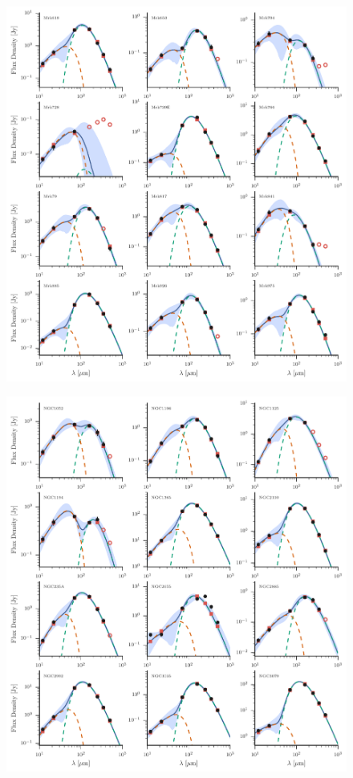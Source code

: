 \begin{figure}
\centering
\includegraphics[width=\textwidth]{figures/sedfig18}
\caption{}
\end{figure}

\begin{figure}
\centering
\includegraphics[width=\textwidth]{figures/sedfig19}
\caption{}
\end{figure}

